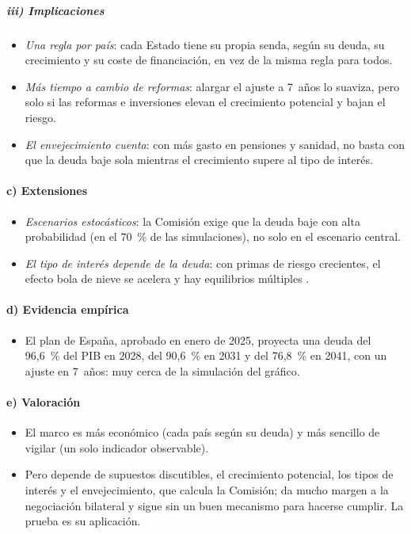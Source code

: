 \documentclass[11pt]{article}
\begin{document}
\subparagraph{iii) Implicaciones}

\begin{itemize}
\item \emph{Una regla por país}: cada Estado tiene su propia senda, según su deuda, su crecimiento y su coste de financiación, en vez de la misma regla para todos.
\item \emph{Más tiempo a cambio de reformas}: alargar el ajuste a 7~años lo suaviza, pero solo si las reformas e inversiones elevan el crecimiento potencial y bajan el riesgo.
\item \emph{El envejecimiento cuenta}: con más gasto en pensiones y sanidad, no basta con que la deuda baje sola mientras el crecimiento supere al tipo de interés.
\end{itemize}

\paragraph{c) Extensiones}

\begin{itemize}
\item \emph{Escenarios estocásticos}: la Comisión exige que la deuda baje con alta probabilidad (en el 70~\% de las simulaciones), no solo en el escenario central.
\item \emph{El tipo de interés depende de la deuda}: con primas de riesgo crecientes, el efecto bola de nieve se acelera y hay equilibrios múltiples .
\end{itemize}

\paragraph{d) Evidencia empírica}

\begin{itemize}
\item El plan de España, aprobado en enero de 2025, proyecta una deuda del 96,6~\% del PIB en 2028, del 90,6~\% en 2031 y del 76,8~\% en 2041, con un ajuste en 7~años\nocite{Consejo2025PlanEspana}: muy cerca de la simulación del gráfico.
\end{itemize}

\paragraph{e) Valoración}

\begin{itemize}
\item El marco es más económico (cada país según su deuda) y más sencillo de vigilar (un solo indicador observable).
\item Pero depende de supuestos discutibles, el crecimiento potencial, los tipos de interés y el envejecimiento, que calcula la Comisión; da mucho margen a la negociación bilateral y sigue sin un buen mecanismo para hacerse cumplir. La prueba es su aplicación.
\end{itemize}
\end{document}
